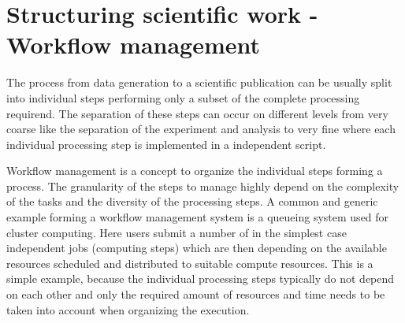 \clearpage
\section{Structuring scientific work - Workflow management}
\label{sec:workflows}
The process from data generation to a scientific publication can be usually split into individual steps performing only a subset of the complete processing requirend. The separation of these steps can occur on different levels from very coarse like the separation of the experiment and analysis to very fine where each individual processing step is implemented in a independent script.

Workflow management is a concept to organize the individual steps forming a process. The granularity of the steps to manage highly depend on the complexity of the tasks and the diversity of the processing steps. A common and generic example forming a workflow management system is a queueing system used for cluster computing. Here users submit a number of in the simplest case independent jobs (computing steps) which are then depending on the available resources scheduled and distributed to suitable compute resources. This is a simple example, because the individual processing steps typically do not depend on each other and only the required amount of resources and time needs to be taken into account when organizing the execution.

